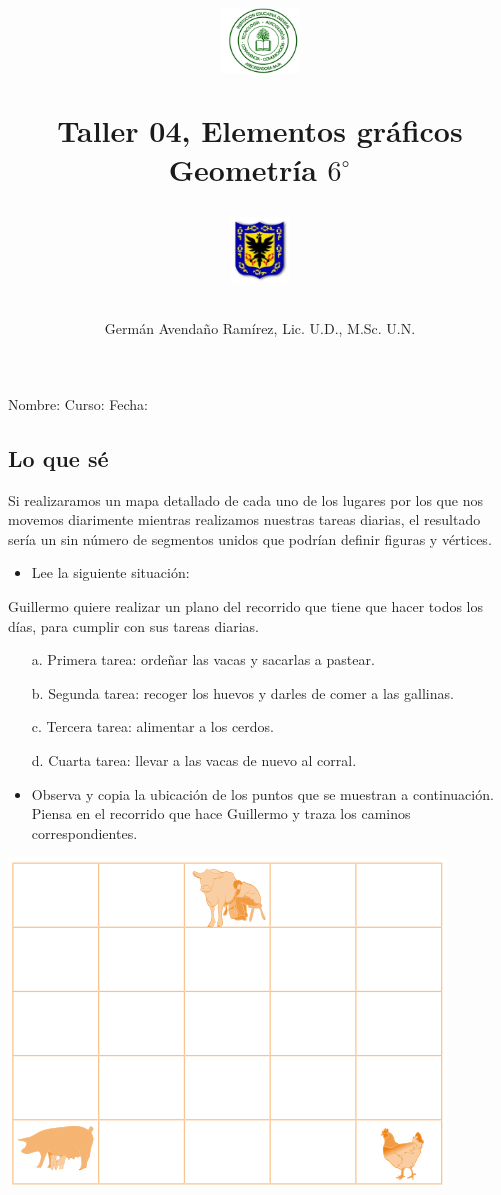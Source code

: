 \documentclass[letterpaper,11pt,twoside]{article}
\author{Germ\'an Avenda\~no Ram\'irez, Lic. U.D., M.Sc. U.N.}
\title{\begin{minipage}{.2\textwidth}
\includegraphics[height=1.75cm]{Images/logo-colegio.png}\end{minipage}
\begin{minipage}{.55\textwidth}
\begin{center}
Taller 04, Elementos gráficos\\
Geometría $6^{\circ}$
\end{center}
\end{minipage}\hfill
\begin{minipage}{.2\textwidth}
\includegraphics[height=1.75cm]{Images/logo-sed.png} 
\end{minipage}}
\date{}
\begin{document}
\maketitle
Nombre: \hrulefill Curso: \underline{\hspace*{44pt}} Fecha: \underline{\hspace*{2.5cm}}
\begin{multicols}{2}
 \section*{Lo que s\'e}
 Si realizaramos un mapa detallado de cada uno de los lugares por
los que nos movemos diarimente mientras realizamos nuestras
tareas diarias, el resultado sería un sin número de segmentos
unidos que podrían definir figuras y vértices.
\begin{itemize}
\item Lee la siguiente situación:
\end{itemize}
Guillermo quiere realizar un plano del recorrido que tiene
que hacer todos los días, para cumplir con sus tareas diarias.
\begin{enumerate}
\item[a.] Primera tarea: ordeñar las vacas y sacarlas a pastear.
\item[b.] Segunda tarea: recoger los huevos y darles de comer a las gallinas.
\item[c.] Tercera tarea: alimentar a los cerdos.
\item[d.] Cuarta tarea: llevar a las vacas de nuevo al corral.
\end{enumerate}
\begin{itemize}
\item Observa y copia la ubicación de los puntos que se muestran a
continuación. Piensa en el recorrido que hace Guillermo y traza
los caminos correspondientes.
\end{itemize}
\includegraphics[scale=.55]{Images/animales_domesticos.png}

\end{multicols}
\end{document}
